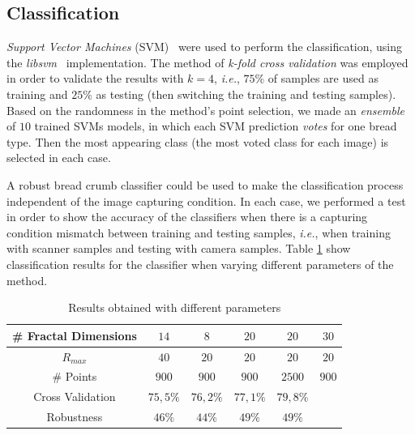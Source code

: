 \documentclass[oneside,a4paper,english,links]{article}
\begin{document}
\subsection{Classification}
{\em Support Vector Machines} (SVM)~\cite{Boser92} were used to perform the classification, using the {\em libsvm}~\cite{Chang2011} implementation. The method of {\em k-fold cross validation} was employed in order to validate the results with $k = 4$, {\em i.e.}, $75\%$ of samples are used as training and $25\%$ as testing (then switching the training and testing samples). Based on the randomness in the method's point selection, we made an {\em ensemble} of $10$ trained SVMs models, in which each SVM prediction {\em votes} for one bread type. Then the most appearing class (the most voted class for each image) is selected in each case.

A robust bread crumb classifier could be used to make the classification process independent of the image capturing condition. In each case, we performed a test in order to show the accuracy of the classifiers when there is a capturing condition mismatch between training and testing samples, {\em i.e.}, when training with scanner samples and testing with camera samples. Table \ref{table:tableFirstTest} show classification results for the classifier when varying different parameters of the method.

\begin{table}[htb]
\centering
\begin{tabular}{|c|c|c|c|c|c|}
    \hline
    \# Fractal Dimensions & $14$ & $8$ & $20$ & $20$ & $30$\\
    \hline
    $R_{max}$ & $40$ & $20$ & $20$ & $20$ & $20$\\
    \hline
    \# Points & $900$ & $900$ & $900$ & $2500$ & $900$\\
    \hline
    Cross Validation  & $75,5\%$ & $76,2\%$ & $77,1\%$ & $79,8\%$ & \\
    \hline
    Robustness & $46\%$ & $44\%$ & $49\%$ & $49\%$ & \\
    \hline
\end{tabular}
\caption{Results obtained with different parameters}
\label{table:tableFirstTest}
\end{table}

\end{document}
